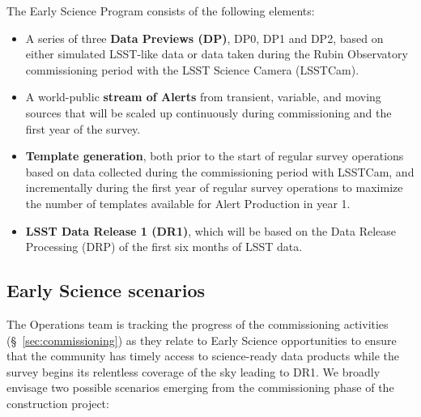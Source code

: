 The Early Science Program consists of the following elements:
\begin{itemize}
	\item A series of three \textbf{Data Previews (DP)}, DP0, DP1 and DP2,  based on either simulated LSST-like data or data taken during the Rubin Observatory commissioning period with the LSST Science Camera (LSSTCam). 
	\item A world-public \textbf{stream of Alerts} from transient, variable, and moving sources that will be scaled up continuously during commissioning and the first year of the survey. 
	\item  \textbf{Template generation}, both prior to the start of regular survey operations based on data collected during the commissioning period with LSSTCam, and incrementally during the first year of regular survey operations  to maximize the number of templates available for Alert Production in year 1. 
	\item \textbf{LSST Data Release 1 (DR1)}, which will be based on the Data Release Processing (DRP) of the first six months of LSST data.
\end{itemize}


\subsection{Early Science scenarios } \label{ssec:scenarios}

The Operations team is tracking the progress of the commissioning activities (\S~\ref{sec:commissioning}) as they relate to Early Science opportunities to ensure that the community has timely access to science-ready data products while the survey begins its relentless coverage of the sky leading to DR1.
We broadly envisage two possible scenarios emerging from the commissioning phase of the construction project: 

